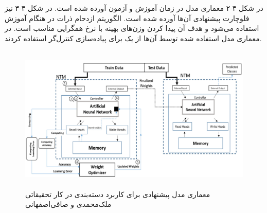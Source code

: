 در شکل ۴-۲ معماری مدل در زمان آموزش و آزمون آورده شده است. در شکل ۴-۳ نیز فلوچارت پیشنهادی آن‌ها آورده شده است. الگوریتم ازدحام ذرات در هنگام آموزش استفاده می‌شود و هدف آن پیدا کردن وزن‌های بهینه با نرخ همگرایی مناسب است. در معماری مدل استفاده شده توسط آن‌ها از یک  برای پیاده‌سازی کنترل‌گر استفاده کردند.\cite{faradonbe2020classifier}
\\

\begin{figure}[!h]
\begin{center}
\includegraphics[height=7cm]{PSO-NTM-2.png}
\end{center}
\caption{معماری مدل پیشنهادی برای کاربرد دسته‌بندی در کار تحقیقاتی ملک‌محمدی و صافی‌اصفهانی \cite{faradonbe2020classifier}} 
\end{figure}

